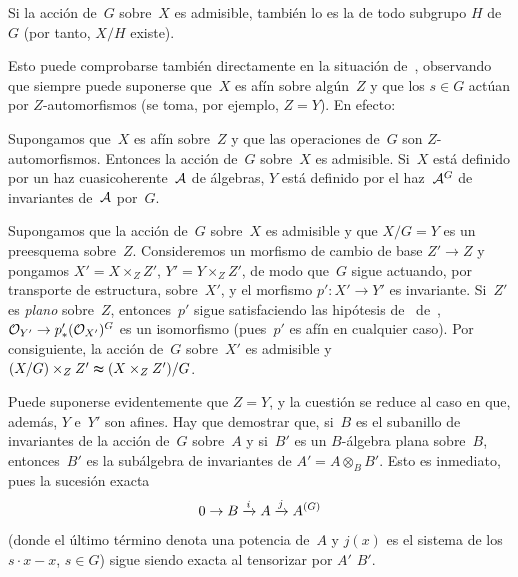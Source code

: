 \setcounter{proposition}{6}

\begin{corollaire}
\label{cor:V.1.7}
Si la acción de~$G$ sobre~$X$ es admisible, también lo es la de todo subgrupo
$H$ de~$G$ (por tanto, $X/H$ existe).
\end{corollaire}

Esto puede comprobarse también directamente en la situación de~,
observando que siempre puede suponerse que~$X$ es afín sobre algún~$Z$ y que
los $s\in G$ actúan por $Z$-automorfismos (se toma, por ejemplo, $Z=Y$). En
efecto:

\begin{corollaire}
\label{cor:V.1.8}
Supongamos que~$X$ es afín sobre~$Z$ y que las operaciones de~$G$ son
$Z$-automorfismos. Entonces la acción de~$G$ sobre~$X$ es admisible. Si~$X$
está definido por un haz cuasicoherente~$\cal{A}$ de álgebras, $Y$ está
definido por el haz~$\cal{A}^G$ de invariantes de~$\cal{A}$ por~$G$.
\end{corollaire}

\begin{proposition}
\label{V.1.9}
Supongamos que la acción de~$G$ sobre~$X$ es admisible y que $X/G=Y$ es un
preesquema sobre~$Z$. Consideremos un morfismo de cambio de base $Z'\to Z$ y
pongamos $X'=X\times_Z Z'$, $Y'=Y\times_Z Z'$, de modo que~$G$ sigue
actuando, por transporte de estructura, sobre~$X'$, y el morfismo
$p'\colon X'\to Y'$ es invariante. Si~$Z'$ es \emph{plano} sobre~$Z$,
entonces~$p'$ sigue satisfaciendo las hipótesis
{de~}
{de~,}
\ie $\cal{O}_{Y'}\to p_*'(\cal{O}_{X'})^G$ es un isomorfismo (pues~$p'$ es
afín en cualquier caso). Por consiguiente, la acción de~$G$ sobre~$X'$ es
admisible y
$(X/G)\times_Z Z'\thickapprox (X\times_Z Z')/G$.
\end{proposition}

Puede suponerse evidentemente que $Z=Y$, y la cuestión se reduce al caso en
que, además, $Y$ e~$Y'$ son afines. Hay que demostrar que, si~$B$ es el
subanillo de invariantes de la acción de~$G$ sobre~$A$ y si~$B'$ es un
$B$-álgebra plana sobre~$B$, entonces~$B'$ es la subálgebra de invariantes de
$A'=A\otimes_B B'$. Esto es inmediato, pues la sucesión exacta
{\enlargethispage{.5cm}}%
$$
0 \to B \lto{i} A \lto{j} A^{(G)}
$$
(donde el último término denota una potencia de~$A$ y $j(x)$ es el sistema
de los $s\cdot x-x$, $s\in G$) sigue siendo exacta al tensorizar por
{$A'$}
{$B'$}.

